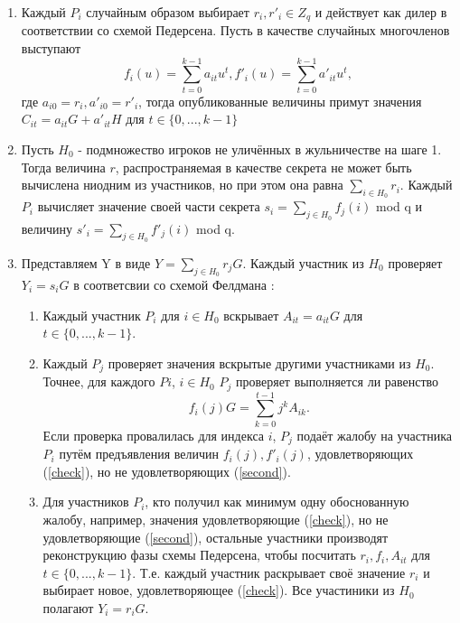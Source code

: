 \begin{enumerate}
    \item Каждый $P_i$ случайным образом выбирает $r_i, r'_i \in Z_q$ и действует как дилер в соответствии со схемой Педерсена. Пусть в качестве случайных многочленов выступают
    $$ f_i(u) = \sum_{t=0}^{k-1}a_{it}u^t , f'_i(u) = \sum_{t=0}^{k-1}a'_{it}u^t,$$ где $a_{i0} = r_i, a'_{i0} = r'_i$, тогда опубликованные величины примут значения $C_{it} = a_{it}G + a'_{it}H$ для $t\in\{0, ...,k-1\}$
    \item Пусть $H_0$ - подмножество игроков не уличённых в жульничестве на шаге 1. Тогда величина $r$, распространяемая в качестве секрета не может быть вычислена ниодним из участников, но при этом она равна $\sum_{i \in H_0}r_i$. Каждый $P_i$ вычисляет значение своей части секрета $s_i = \sum_{j \in H_0}f_j(i)$ mod q и величину $s'_i = \sum_{j \in H_0}f'_j(i)$ mod q.
    \item Представляем Y в виде $Y = \sum_{j \in H_0}r_jG$. Каждый участник из $H_0$ проверяет $Y_i = s_iG$ в соответсвии со схемой Фелдмана \cite{Fel}:
    \begin{enumerate}[label=\alph*)]
        \item Каждый участник $P_i$ для $i \in H_0$ вскрывает $A_{it} = a_{it}G$ для $t \in \{0, ...,k-1\}$. 
        \item Каждый $P_j$ проверяет значения вскрытые другими участниками из $H_0$. Точнее, для каждого $Pi$, $i \in H_0$ $P_j$ проверяет выполняется ли равенство
        \begin{equation}\label{second}
            f_i(j)G = \sum_{k=0}^{t-1} j^k A_{ik}.
        \end{equation}
        Если проверка провалилась для индекса $i$, $P_j$ подаёт жалобу на участника $P_i$ путём предъявления величин $f_i(j), f'_i(j)$, удовлетворяющих (\ref{check}), но не удовлетворяющих (\ref{second}).
        \item Для участников  $P_i$, кто получил как минимум одну обоснованную жалобу, например, значения удовлетворяющие (\ref{check}), но не удовлетворяющие (\ref{second}), остальные участники производят реконструкцию фазы схемы Педерсена, чтобы посчитать $r_i, f_i, A_{it}$ для $t \in \{0,...,k-1\}$. Т.е. каждый участник раскрывает своё значение $r_i$ и выбирает новое, удовлетворяющее (\ref{check}). Все участиники из $H_0$ полагают $Y_i = r_iG$. 
    \end{enumerate}
    
\end{enumerate}

